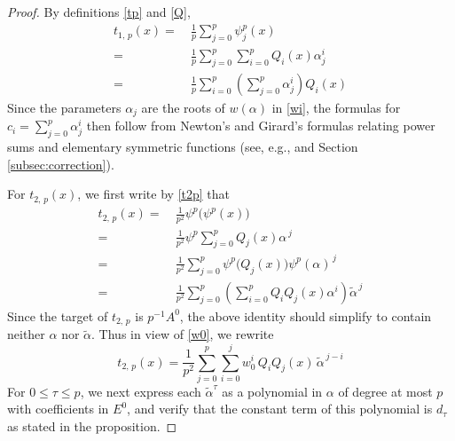 \documentclass{gtpart}
\theoremstyle{definition}
\theoremstyle{remark}
\newcommand{\A}{\alpha}
\newcommand{\T}{\tau}
\renewcommand{\=}{\approx}
\renewcommand{\-}{\sim}
\numberwithin{equation}{section}
\begin{document}
\begin{proof}
 By definitions \eqref{tp} and \eqref{Q}, 
 \begin{equation*}
  \begin{split}
   t_{1,\,p}(x) = & ~ \frac{1}{p} \sum_{j = 0}^p \psi^p_j(x) \\
                = & ~ \frac{1}{p} \sum_{j = 0}^p \sum_{i = 0}^p Q_i(x) \A_j^i \\
                = & ~ \frac{1}{p} \sum_{i = 0}^p \left( \sum_{j = 0}^p 
                    \A_j^i \right) Q_i(x) 
  \end{split}
 \end{equation*}
 Since the parameters $\A_j$ are the roots of $w(\A)$ in \eqref{wi}, the 
 formulas for $c_i = \sum_{j=0}^p \A_j^i$ then follow from Newton's and Girard's 
 formulas relating power sums and elementary symmetric functions (see, e.g., 
 \cite[Problem 16-A]{cc} and Section \ref{subsec:correction}).  

 For $t_{2,\,p}(x)$, we first write by \eqref{t2p} that 
 \begin{equation*}
  \begin{split}
   t_{2,\,p}(x) = & ~ \frac{1}{p^2} \psi^p \big( \psi^p(x) \big) \\
                = & ~ \frac{1}{p^2} \psi^p \sum_{j = 0}^p Q_j(x) \A^{\,j} \\
                = & ~ \frac{1}{p^2} \sum_{j = 0}^p \psi^p \big( Q_j(x) \big) 
                  \psi^p(\A)^{\,j} \\
                = & ~ \frac{1}{p^2} \sum_{j = 0}^p \left( \sum_{i = 0}^p 
                  Q_i Q_j(x) \A^i \right) \widetilde{\A}^{\,j} 
  \end{split}
 \end{equation*}
 Since the target of $t_{2,\,p}$ is $p^{-1} A^0$, the above identity should 
 simplify to contain neither $\A$ nor $\widetilde{\A}$.  Thus in view of 
 \eqref{w0}, we rewrite 
 \[
  t_{2,\,p}(x) = \frac{1}{p^2} \sum_{j = 0}^p \sum_{i = 0}^j w_0^i \, Q_i Q_j(x) 
  \, \widetilde{\A}^{\,j - i} 
 \]
 For $0 \leq \T \leq p$, we next express each $\widetilde{\A}^\T$ as a 
 polynomial in $\A$ of degree at most $p$ with coefficients in $E^0$, and verify 
 that the constant term of this polynomial is $d_\T$ as stated in the 
 proposition.  


\end{proof}
\end{document}
